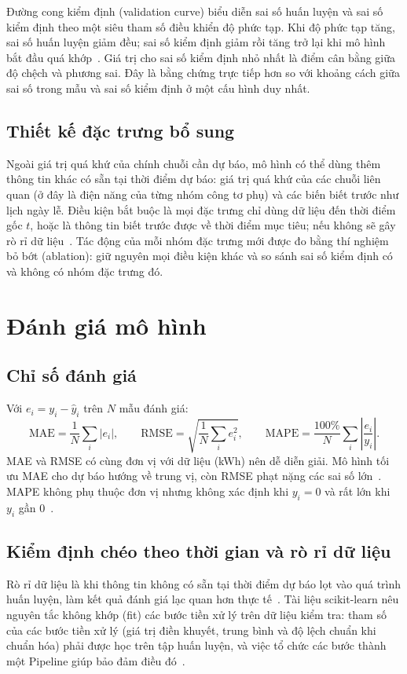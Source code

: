 Đường cong kiểm định (validation curve) biểu diễn sai số huấn luyện và sai số kiểm định theo một siêu tham số điều khiển độ phức tạp. Khi độ phức tạp tăng, sai số huấn luyện giảm đều; sai số kiểm định giảm rồi tăng trở lại khi mô hình bắt đầu quá khớp~\cite[mục 7.2]{hastie2009elements}. Giá trị cho sai số kiểm định nhỏ nhất là điểm cân bằng giữa độ chệch và phương sai. Đây là bằng chứng trực tiếp hơn so với khoảng cách giữa sai số trong mẫu và sai số kiểm định ở một cấu hình duy nhất.

\subsection{Thiết kế đặc trưng bổ sung}
Ngoài giá trị quá khứ của chính chuỗi cần dự báo, mô hình có thể dùng thêm thông tin khác có sẵn tại thời điểm dự báo: giá trị quá khứ của các chuỗi liên quan (ở đây là điện năng của từng nhóm công tơ phụ) và các biến biết trước như lịch ngày lễ. Điều kiện bắt buộc là mọi đặc trưng chỉ dùng dữ liệu đến thời điểm gốc $t$, hoặc là thông tin biết trước được về thời điểm mục tiêu; nếu không sẽ gây rò rỉ dữ liệu~\cite{kaufman2012leakage}. Tác động của mỗi nhóm đặc trưng mới được đo bằng thí nghiệm bỏ bớt (ablation): giữ nguyên mọi điều kiện khác và so sánh sai số kiểm định có và không có nhóm đặc trưng đó.

\section{Đánh giá mô hình}
\label{sec:eval_theory}

\subsection{Chỉ số đánh giá}
Với $e_i = y_i - \hat{y}_i$ trên $N$ mẫu đánh giá:
\begin{equation}
    \mathrm{MAE} = \frac{1}{N}\sum_{i}|e_i|, \qquad
    \mathrm{RMSE} = \sqrt{\frac{1}{N}\sum_{i} e_i^2}, \qquad
    \mathrm{MAPE} = \frac{100\%}{N}\sum_{i}\left|\frac{e_i}{y_i}\right|.
    \label{eq:metrics}
\end{equation}
MAE và RMSE có cùng đơn vị với dữ liệu (kWh) nên dễ diễn giải. Mô hình tối ưu MAE cho dự báo hướng về trung vị, còn RMSE phạt nặng các sai số lớn~\cite[mục 5.8]{hyndman2021fpp3}. MAPE không phụ thuộc đơn vị nhưng không xác định khi $y_i = 0$ và rất lớn khi $y_i$ gần 0~\cite{hyndman2021fpp3,hyndman2006another}.

\subsection{Kiểm định chéo theo thời gian và rò rỉ dữ liệu}
Rò rỉ dữ liệu là khi thông tin không có sẵn tại thời điểm dự báo lọt vào quá trình huấn luyện, làm kết quả đánh giá lạc quan hơn thực tế~\cite{kaufman2012leakage}. Tài liệu scikit-learn nêu nguyên tắc không khớp (fit) các bước tiền xử lý trên dữ liệu kiểm tra: tham số của các bước tiền xử lý (giá trị điền khuyết, trung bình và độ lệch chuẩn khi chuẩn hóa) phải được học trên tập huấn luyện, và việc tổ chức các bước thành một Pipeline giúp bảo đảm điều đó~\cite{sklearn2026pitfalls}.

